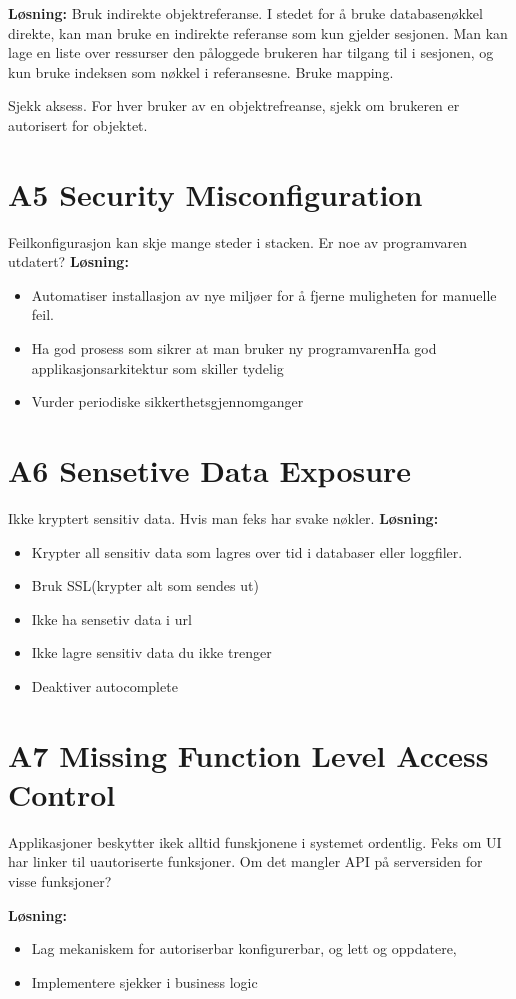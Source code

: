 \documentclass{article}
\begin{document}
\begin{flushleft}
        \textbf{Løsning:} Bruk indirekte objektreferanse. I stedet for å bruke databasenøkkel direkte, kan man bruke en indirekte referanse som kun gjelder sesjonen. 
        Man kan lage en liste over ressurser den påloggede brukeren har tilgang til i sesjonen, og kun bruke indeksen som nøkkel i referansesne. Bruke mapping.
        \par 
        \bigskip
        Sjekk aksess. For hver bruker av en objektrefreanse, sjekk om brukeren er autorisert for objektet.

        \section{A5 Security Misconfiguration}
        Feilkonfigurasjon kan skje mange steder i stacken. Er noe av programvaren utdatert?
        \textbf{Løsning:} \begin{itemize}
            \item Automatiser installasjon av nye miljøer for å fjerne muligheten for manuelle feil. 
            \item Ha god prosess som sikrer at man bruker ny programvarenHa god applikasjonsarkitektur som skiller tydelig
            \item Vurder periodiske sikkerthetsgjennomganger 
        \end{itemize}

        \section{A6 Sensetive Data Exposure}
        Ikke kryptert sensitiv data. Hvis man feks har svake nøkler. 
        \textbf{Løsning:}\begin{itemize}
            \item Krypter all sensitiv data som lagres over tid i databaser eller loggfiler.
            \item Bruk SSL(krypter alt som sendes ut)
            \item Ikke ha sensetiv data i url
            \item Ikke lagre sensitiv data du ikke trenger
            \item Deaktiver autocomplete
        \end{itemize}

        \section{A7 Missing Function Level Access Control}
        Applikasjoner beskytter ikek alltid funskjonene i systemet ordentlig. Feks om UI har linker til uautoriserte funksjoner.
        Om det mangler API på serversiden for visse funksjoner?
        \par 
        \bigskip
        \textbf{Løsning:}
        \begin{itemize}
            \item Lag mekaniskem for autoriserbar konfigurerbar, og lett og oppdatere, 
            \item Implementere sjekker i business logic
        \end{itemize}


\end{flushleft}
\end{document}
